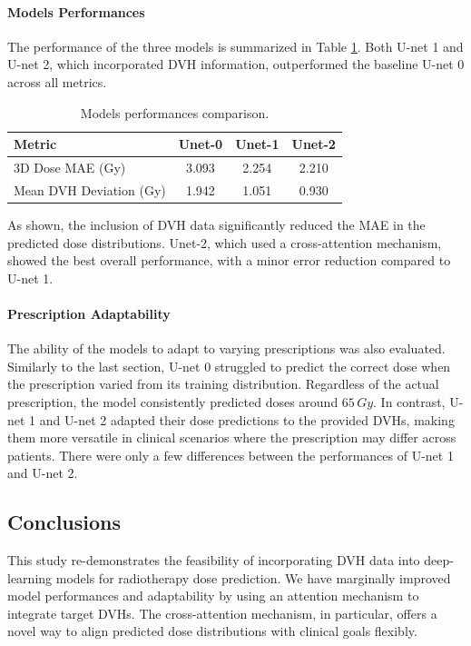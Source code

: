 \paragraph{Models Performances}
The performance of the three models is summarized in Table \ref{tab:model_performance}.
Both U-net 1 and U-net 2, which incorporated DVH information, outperformed the baseline U-net 0 across all metrics.

\begin{table}
	\centering
	\begin{tabular}{|l|c|c|c|}
		\hline
		\textbf{Metric}         & \textbf{Unet-0} & \textbf{Unet-1} & \textbf{Unet-2} \\
		\hline
		3D Dose MAE (Gy)        & 3.093           & 2.254           & 2.210           \\
		\hline
		Mean DVH Deviation (Gy) & 1.942           & 1.051           & 0.930           \\
		\hline
	\end{tabular}
	\caption{Models performances comparison.}
	\label{tab:model_performance}
\end{table}

As shown, the inclusion of DVH data significantly reduced the MAE in the predicted dose distributions.
Unet-2, which used a cross-attention mechanism, showed the best overall performance, with a minor error reduction compared to U-net 1.

\paragraph{Prescription Adaptability}
The ability of the models to adapt to varying prescriptions was also evaluated.
Similarly to the last section, U-net 0 struggled to predict the correct dose when the prescription varied from its training distribution.
Regardless of the actual prescription, the model consistently predicted doses around $65\,\textit{Gy}$.
In contrast, U-net 1 and U-net 2 adapted their dose predictions to the provided DVHs, making them more versatile in clinical scenarios where the prescription may differ across patients.
There were only a few differences between the performances of U-net 1 and U-net 2.

\subsection{Conclusions}
This study re-demonstrates the feasibility of incorporating DVH data into deep-learning models for radiotherapy dose prediction.
We have marginally improved model performances and adaptability by using an attention mechanism to integrate target DVHs.
The cross-attention mechanism, in particular, offers a novel way to align predicted dose distributions with clinical goals flexibly.

